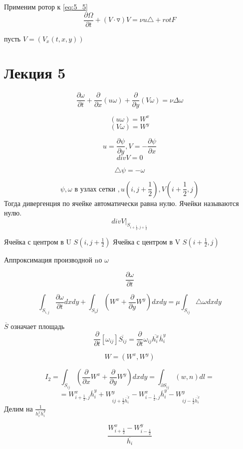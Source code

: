 \documentclass[12pt, a4paper]{article}
\begin{document}
Применим ротор к \ref{eq:5_5}
\begin{equation}\label{eq:5_6}
\frac{\partial \Omega}{\partial t} + (V \cdot \triangledown) V = \nu u \triangle + rot F
\end{equation}

пусть $ V = (V_x(t,x, y)) $

\section{Лекция 5}

\[ \frac{\partial \omega}{ \partial t } + \frac{\partial}{\partial x} (u \omega) + \frac{\partial}{\partial y }(V \omega) = \nu  \Delta \omega\]

\[ (u \omega) = W^x \]
\[ (V \omega) = W^y \]

\[ u = \frac{\partial \psi}{\partial y}, V = -\frac{\partial \psi}{\partial x} \]
\[ div V = 0 \]

\[ \triangle \psi = -\omega \]

\[ \psi, \omega \textrm{ в узлах сетки }, u(i, j+\frac{1}{2}), V(i+\frac{1}{2}, j) \]
Тогда дивергенция по ячейке автоматически равна нулю. Ячейки называются нулю.
\[ div V|_{S_{i+\frac{1}{2}, j+\frac{1}{2}}} \]

Ячейка с центром в U $ S(i, j+\frac{1}{2}) $
Ячейка с центром в V $ S(i+\frac{1}{2}, j) $

Аппроксимация производной nо $ \omega $

\[ \frac{\partial \omega}{\partial t} \]

\[ \int_{S_{i,j}}^{} \frac{\partial\omega}{\partial t} dx dy + \int_{S_ij}^{}(W^x + \frac{\partial}{\partial y } W^y) dx dy = \mu \int_{S_{ij}}^{} \triangle \omega dx dy \]

$ \overline{S} $ означает площадь
\[ \frac{\partial}{\partial t} [\omega_{ij}] \overline{S_{ij}} = \frac{\partial}{\partial t} \omega_{ij} \overline{h_i^x} \overline{h}^y_i \]

\[ W = (W^x, W^y) \]

\[ I_2 = \int_{S_{ij}}^{} (\frac{\partial}{\partial x} W^x +\frac{\partial}{\partial y } W^y) dx dy = \int_{\partial S_{ij}}^{} (w, n )dl = \]
\[ = W^x_{i+\frac{1}{2}, j} \overline{h}^y_i + W^y_{ij+\frac{1}{2} \overline{\overline{h}^x_i}} - W^x_{i-\frac{1}{2}, j} \overline{h}^y_i - W^y_{ij-\frac{1}{2} \overline{\overline{h}^x_i}}\]
Делим на $ \frac{1}{\overline{h^x_i} \overline{h}^y_i} $

\[ \frac{W^x_{i+\frac{1}{2}} - W^y_{i-\frac{1}{2}}}{\overline{h_i}} \]
\end{document}
